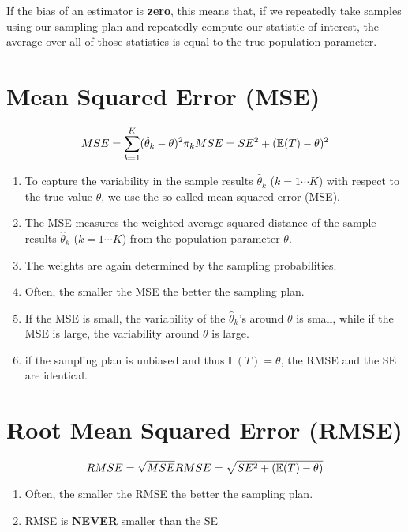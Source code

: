 If the bias of an estimator is \textbf{zero}, this means that, if we repeatedly take samples using our sampling plan and repeatedly compute our statistic of interest, the average over all of those statistics is equal to the true population parameter.

\section{Mean Squared Error (MSE) \cite{ism-1}}
\[
    \hfill
    MSE = \displaystyle\sum_{k=1}^{K}
    (\hat{\theta}_k - \theta)^2 \pi_k
    \hfill
    MSE = SE^2 + (\mathbb{E}(T) - \theta)^2
    \hfill
\]

\begin{enumerate}
    \item To capture the variability in the sample results  $\hat{\theta}_k$ ($k = 1\cdots K$) with respect to the true value $\theta$, we use the so-called mean squared error (MSE).

    \item The MSE measures the weighted average squared distance of the sample results $\hat{\theta}_k$ ($k = 1\cdots K$) from the population parameter $\theta$.

    \item The weights are again determined by the sampling probabilities. 

    \item Often, the smaller the MSE the better the sampling plan.

    \item If the MSE is small, the variability of the $\hat{\theta}_k$’s around $\theta$ is small, while if the MSE is large, the variability around $\theta$ is large.

    \item if the sampling plan is unbiased and thus $\mathbb{E}(T) = \theta$, the RMSE and the SE are identical.

\end{enumerate}


\section{Root Mean Squared Error (RMSE) \cite{ism-1}}
\[
    \hfill
    RMSE = \sqrt{MSE}
    \hfill
    RMSE = \sqrt{SE^2 + (\mathbb{E}(T) - \theta)}
    \hfill
\]

\begin{enumerate}
    \item Often, the smaller the RMSE the better the sampling plan.

    \item RMSE is \textbf{NEVER} smaller than the SE
\end{enumerate}


